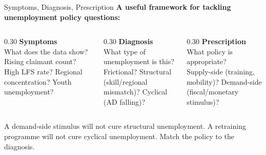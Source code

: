 \documentclass[16pt,aspectratio=169]{beamer}
\begin{document}
\begin{frame}{Symptoms, Diagnosis, Prescription}
    \textbf{A useful framework for tackling unemployment policy questions:}

    \vspace{0.6em}
    \begin{columns}
        \begin{column}{0.30\textwidth}
            \textbf{Symptoms}\\
            \small What does the data show?\\
            Rising claimant count? High LFS rate? Regional concentration? Youth unemployment?
        \end{column}
        \begin{column}{0.30\textwidth}
            \textbf{Diagnosis}\\
            \small What type of unemployment is this?\\
            Frictional? Structural (skill/regional mismatch)? Cyclical (AD falling)?
        \end{column}
        \begin{column}{0.30\textwidth}
            \textbf{Prescription}\\
            \small What policy is appropriate?\\
            Supply-side (training, mobility)? Demand-side (fiscal/monetary stimulus)?
        \end{column}
    \end{columns}

    \vspace{0.8em}
    \begin{keypoint}
        A demand-side stimulus will not cure structural unemployment. A retraining programme will not cure cyclical unemployment. Match the policy to the diagnosis.
    \end{keypoint}
\end{frame}
\end{document}
